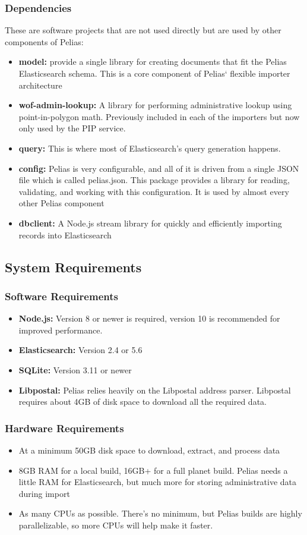 \subsubsection{Dependencies}
These are software projects that are not used directly but are used by other components of Pelias:
\begin{itemize}
\item \textbf{model:} provide a single library for creating documents that fit the Pelias Elasticsearch schema. This is a core component of Pelias‘ flexible importer architecture
\item \textbf{wof-admin-lookup:} A library for performing administrative lookup using point-in-polygon math. Previously included in each of the importers but now only used by the PIP service.
\item \textbf{query:} This is where most of Elasticsearch’s query generation happens.
\item \textbf{config:} Pelias is very configurable, and all of it is driven from a single JSON file which is called pelias.json. This package provides a library for reading, validating, and working with this configuration. It is used by almost every other Pelias component
\item \textbf{dbclient:} A Node.js stream library for quickly and efficiently importing records into Elasticsearch
\end{itemize}

\subsection{System Requirements}
\subsubsection{Software Requirements}
\begin{itemize}
\item \textbf{Node.js:} Version 8 or newer is required, version 10 is recommended for improved performance.
\item \textbf{Elasticsearch:} Version 2.4 or 5.6
\item \textbf{SQLite:} Version 3.11 or newer
\item \textbf{Libpostal:} Pelias relies heavily on the Libpostal address parser. Libpostal requires about 4GB of disk space to download all the required data.
\end{itemize}

\subsubsection{Hardware Requirements}
\begin{itemize}
\item At a minimum 50GB disk space to download, extract, and process data
\item 8GB RAM for a local build, 16GB+ for a full planet build. Pelias needs a little RAM for Elasticsearch, but much more for storing administrative data during import
\item As many CPUs as possible. There's no minimum, but Pelias builds are highly parallelizable, so more CPUs will help make it faster.
\end{itemize}

